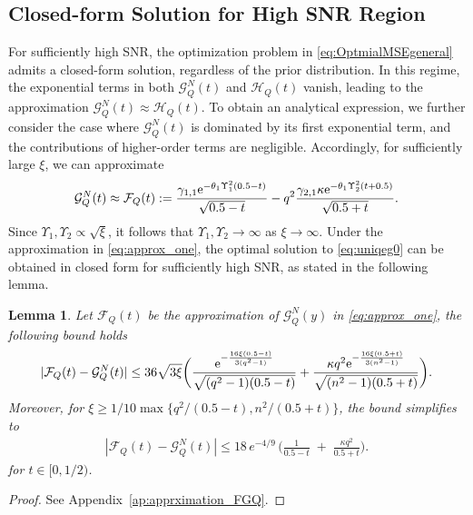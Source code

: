 \documentclass[journal,12pt,onecolumn,draftclsnofoot]{IEEEtran}
\newtheorem{lem}{Lemma}
\theoremstyle{definition}
\begin{document}
\subsection{Closed-form Solution for High SNR Region}


For sufficiently high SNR, the optimization problem in \eqref{eq:OptmialMSEgeneral} admits a closed-form solution, regardless of the prior distribution. 
In this regime, the exponential terms in both $\mathcal{G}_{Q}^{N}(t)$ and $\mathcal{H}_Q(t)$ vanish, leading to the approximation $\mathcal{G}_{Q}^{N}(t) \approx \mathcal{H}_Q(t)$. 
To obtain an analytical expression, we further consider the case where $\mathcal{G}_{Q}^{N}(t)$ is dominated by its first exponential term, and the contributions of higher-order terms are negligible.  Accordingly, for sufficiently large $\xi$, we can approximate
\begin{align}
    \label{eq:approx_one}
     \mathcal{G}_Q^{N}(t) \approx \mathcal{F}_Q(t) :=  \frac{{\gamma}_{1,1}  {\rm e}^{-\theta_{1} \Upsilon_1^2 (0.5-t)}}{\sqrt{0.5-t}} -q^2\frac{\gamma_{2,1} \kappa {\rm e}^{-\theta_{1} \Upsilon_2^2 (t+0.5)}}{\sqrt{0.5+t}}. 
\end{align}
Since $\Upsilon_1, \Upsilon_2 \propto \sqrt{\xi}$, it follows that $\Upsilon_1, \Upsilon_2 \to \infty$ as $\xi \to \infty$. Under the approximation in \eqref{eq:approx_one}, the optimal solution to \eqref{eq:uniqeg0} can be obtained in closed form for sufficiently high SNR, as stated in the following lemma.


\begin{lem}\label{lem:apprximation_fg}
    Let $\mathcal{F}_{Q}(t)$ be the approximation of $\mathcal{G}_{Q}^{N}(y)$ in \eqref{eq:approx_one},  the following bound holds
        \begin{align}
            |\mathcal{F}_Q(t)  - \mathcal{G}_Q^{N}(t)| \leq  36\sqrt{3\xi}  \bigg( \frac{{\rm e}^{-\frac{16\xi(0.5-t)}{3(q^2-1)}}}{\sqrt{(q^2-1){(0.5-t)}}} + \frac{\kappa q^2 {\rm e}^{-\frac{16\xi(0.5+t)}{3(n^2-1)}}}{\sqrt{(n^2-1){(0.5+t)}}}\bigg). 
    \end{align}
    Moreover, for $ \xi \geq {1}/{10} \max\Big\{{q^2}/{(0.5-t)}, {n^2}/{(0.5+t)} \Big\} $, the bound simplifies to
    \begin{align}
      |\mathcal{F}_Q(t)  - \mathcal{G}_Q^{N}(t)| \leq  18\,e^{-4/9}\,\biggl(\frac{1}{0.5-t} \;+\;\frac{\kappa q^2}{0.5+t}\biggr).
    \end{align}
    for $t\in [0,1/2)$.
\end{lem}
\begin{proof}
    See Appendix~\ref{ap:apprximation_FGQ}.
\end{proof}
\end{document}

